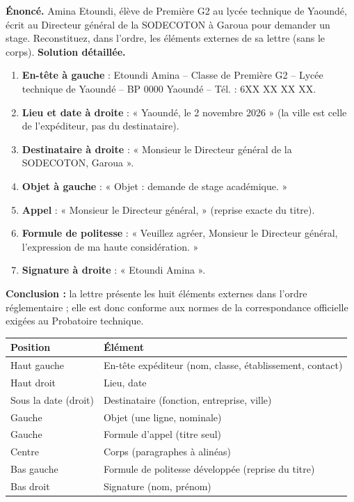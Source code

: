 \documentclass[11pt]{article}
\begin{document}
\begin{exoresolu}
\textbf{Énoncé.} Amina Etoundi, élève de Première G2 au lycée technique de Yaoundé, écrit au Directeur général de la SODECOTON à Garoua pour demander un stage. Reconstituez, dans l'ordre, les éléments externes de sa lettre (sans le corps).
\tcblower
\textbf{Solution détaillée.}
\begin{enumerate}
\item \textbf{En-tête à gauche} : Etoundi Amina -- Classe de Première G2 -- Lycée technique de Yaoundé -- BP 0000 Yaoundé -- Tél. : 6XX XX XX XX.
\item \textbf{Lieu et date à droite} : « Yaoundé, le 2 novembre 2026 » (la ville est celle de l'expéditeur, pas du destinataire).
\item \textbf{Destinataire à droite} : « Monsieur le Directeur général de la SODECOTON, Garoua ».
\item \textbf{Objet à gauche} : « Objet : demande de stage académique. »
\item \textbf{Appel} : « Monsieur le Directeur général, » (reprise exacte du titre).
\item \textbf{Formule de politesse} : « Veuillez agréer, Monsieur le Directeur général, l'expression de ma haute considération. »
\item \textbf{Signature à droite} : « Etoundi Amina ».
\end{enumerate}
\textbf{Conclusion :} la lettre présente les huit éléments externes dans l'ordre réglementaire ; elle est donc conforme aux normes de la correspondance officielle exigées au Probatoire technique.
\end{exoresolu}

\begin{aretenir}
\begin{center}
\begin{tabularx}{\linewidth}{|l|X|}\hline
\textbf{Position} & \textbf{Élément} \\ \hline
Haut gauche & En-tête expéditeur (nom, classe, établissement, contact) \\ \hline
Haut droit & Lieu, date \\ \hline
Sous la date (droit) & Destinataire (fonction, entreprise, ville) \\ \hline
Gauche & Objet (une ligne, nominale) \\ \hline
Gauche & Formule d'appel (titre seul) \\ \hline
Centre & Corps (paragraphes à alinéas) \\ \hline
Bas gauche & Formule de politesse développée (reprise du titre) \\ \hline
Bas droit & Signature (nom, prénom) \\ \hline
\end{tabularx}
\end{center}
\end{aretenir}
\end{document}
